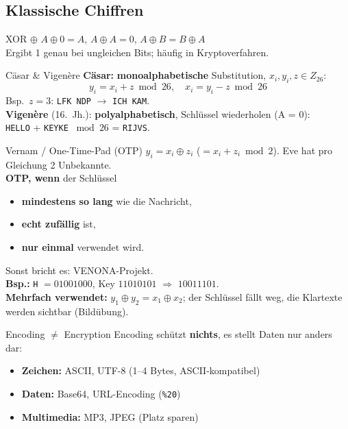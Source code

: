\documentclass[a4paper, fontsize=7pt]{scrartcl}
\begin{document}
\subsection{Klassische Chiffren}

\begin{mainbox}{XOR $\oplus$}
$A \oplus 0 = A$, \quad $A \oplus A = 0$, \quad $A \oplus B = B \oplus A$\\
Ergibt 1 genau bei ungleichen Bits; häufig in Kryptoverfahren.
\end{mainbox}

\begin{mainbox}{Cäsar \& Vigenère}
\textbf{Cäsar:} \textbf{monoalphabetische} Substitution, $x_i, y_i, z \in Z_{26}$:
$$y_i = x_i + z \bmod 26,\quad x_i = y_i - z \bmod 26$$
Bsp.\ $z = 3$: \texttt{LFK NDP} $\to$ \texttt{ICH KAM}.\\[2pt]
\textbf{Vigenère} (16.\ Jh.): \textbf{polyalphabetisch}, Schlüssel wiederholen
(A = 0):\\
\texttt{HELLO} + \texttt{KEYKE} $\bmod 26$ = \texttt{RIJVS}.
\end{mainbox}

\begin{mainbox}{Vernam / One-Time-Pad (OTP)}
$y_i = x_i \oplus z_i$ ($= x_i + z_i \bmod 2$). Eve hat pro Gleichung 2 Unbekannte.\\
\textbf{OTP, wenn} der Schlüssel
\begin{itemize}
    \item \textbf{mindestens so lang} wie die Nachricht,
    \item \textbf{echt zufällig} ist,
    \item \textbf{nur einmal} verwendet wird.
\end{itemize}
Sonst bricht es: VENONA-Projekt.\\
\textbf{Bsp.:} \texttt{H} $= 01001000$, Key $11010101$ $\Rightarrow$ $10011101$.\\
\textbf{Mehrfach verwendet:} $y_1 \oplus y_2 = x_1 \oplus x_2$; der Schlüssel fällt
weg, die Klartexte werden sichtbar (Bildübung).
\end{mainbox}

\begin{mainbox}{Encoding $\neq$ Encryption}
Encoding schützt \textbf{nichts}, es stellt Daten nur anders dar:
\begin{itemize}
    \item \textbf{Zeichen:} ASCII, UTF-8 (1--4 Bytes, ASCII-kompatibel)
    \item \textbf{Daten:} Base64, URL-Encoding (\texttt{\%20})
    \item \textbf{Multimedia:} MP3, JPEG (Platz sparen)
\end{itemize}
\end{mainbox}
\end{document}
